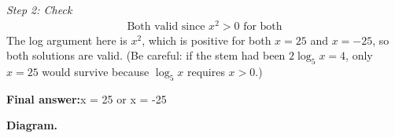 \documentclass[11pt]{article}
\begin{document}
\textit{Step 2: Check}
\[\begin{gathered}
\text{Both valid since } x^2 > 0 \text{ for both}
\end{gathered}\]
The log argument here is \( x^2 \), which is positive for both \( x = 25 \) and \( x = -25 \), so both solutions are valid. (Be careful: if the stem had been \( 2\log_5 x = 4 \), only \( x = 25 \) would survive because \( \log_5 x \) requires \( x > 0 \).)

\begin{answerbox}
\textbf{Final answer:}\quad x = 25 or x = -25
\end{answerbox}
\textbf{Diagram.}

\begin{center}
\end{center}
\end{document}
